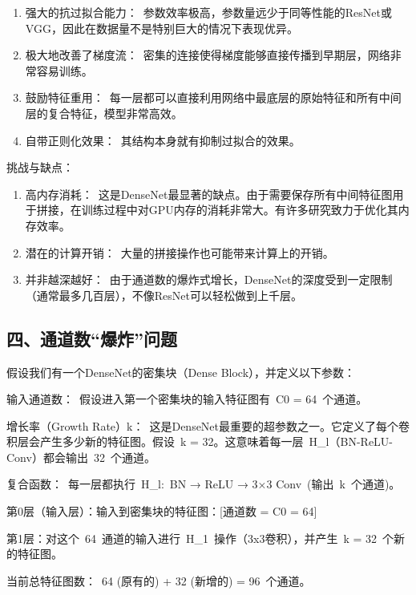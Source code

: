 \begin{enumerate}
\def\labelenumi{\arabic{enumi}.}
\item
  强大的抗过拟合能力：~参数效率极高，参数量远少于同等性能的ResNet或VGG，因此在数据量不是特别巨大的情况下表现优异。
\item
  极大地改善了梯度流：~密集的连接使得梯度能够直接传播到早期层，网络非常容易训练。
\item
  鼓励特征重用：~每一层都可以直接利用网络中最底层的原始特征和所有中间层的复合特征，模型非常高效。
\item
  自带正则化效果：~其结构本身就有抑制过拟合的效果。
\end{enumerate}

挑战与缺点：

\begin{enumerate}
\def\labelenumi{\arabic{enumi}.}
\item
  高内存消耗：~这是DenseNet最显著的缺点。由于需要保存所有中间特征图用于拼接，在训练过程中对GPU内存的消耗非常大。有许多研究致力于优化其内存效率。
\item
  潜在的计算开销：~大量的拼接操作也可能带来计算上的开销。
\item
  并非越深越好：~由于通道数的爆炸式增长，DenseNet的深度受到一定限制（通常最多几百层），不像ResNet可以轻松做到上千层。
\end{enumerate}

\hypertarget{ux56dbux901aux9053ux6570ux7206ux70b8ux95eeux9898}{%
\subsection{四、通道数``爆炸''问题}\label{ux56dbux901aux9053ux6570ux7206ux70b8ux95eeux9898}}

假设我们有一个DenseNet的密集块（Dense Block），并定义以下参数：

输入通道数：~假设进入第一个密集块的输入特征图有~C0 = 64~个通道。

增长率（Growth Rate）k：~这是DenseNet最重要的超参数之一。它定义了每个卷积层会产生多少新的特征图。假设~k = 32。这意味着每一层~H\_l（BN-ReLU-Conv）都会输出~32~个通道。

复合函数：~每一层都执行~H\_l:~BN → ReLU → 3×3 Conv~(输出~k~个通道)。

第0层（输入层）：输入到密集块的特征图：{[}通道数 = C0 = 64{]}

第1层：对这个~64~通道的输入进行~H\_1~操作（3x3卷积），并产生~k = 32~个新的特征图。

当前总特征图数：~64 (原有的) + 32 (新增的) = 96~个通道。

